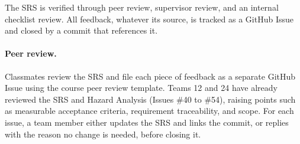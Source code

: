 \documentclass[12pt, titlepage]{article}
\begin{document}



The SRS \citep{SRS} is verified through peer review, supervisor review, and an
internal checklist review. All feedback, whatever its source, is tracked as a
GitHub Issue and closed by a commit that references it.

\paragraph{Peer review.}
Classmates review the SRS and file each piece of feedback as a separate GitHub
Issue using the course peer review template. Teams 12 and 24 have already
reviewed the SRS and Hazard Analysis (Issues \#40 to \#54), raising points such
as measurable acceptance criteria, requirement traceability, and scope. For each
issue, a team member either updates the SRS and links the commit, or replies
with the reason no change is needed, before closing it.
\end{document}
